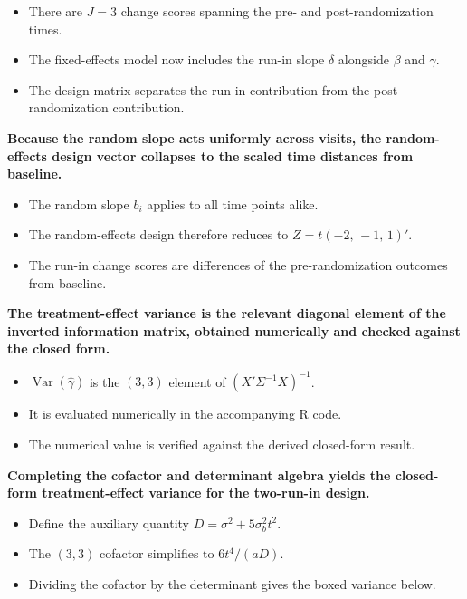 \documentclass[
  11pt,
]{article}
\begin{document}
\begin{itemize}\setlength{\itemsep}{2pt}\setlength{\parskip}{0pt}
\item There are $J = 3$ change scores spanning the pre- and post-randomization times.
\item The fixed-effects model now includes the run-in slope $\delta$ alongside $\beta$ and $\gamma$.
\item The design matrix separates the run-in contribution from the post-randomization contribution.
\end{itemize}

\textbf{Because the random slope acts uniformly across visits, the random-effects design vector collapses to the scaled time distances from baseline.}

\begin{itemize}\setlength{\itemsep}{2pt}\setlength{\parskip}{0pt}
\item The random slope $b_i$ applies to all time points alike.
\item The random-effects design therefore reduces to $Z = t(-2,\, -1,\, 1)'$.
\item The run-in change scores are differences of the pre-randomization outcomes from baseline.
\end{itemize}

\textbf{The treatment-effect variance is the relevant diagonal element of the inverted information matrix, obtained numerically and checked against the closed form.}

\begin{itemize}\setlength{\itemsep}{2pt}\setlength{\parskip}{0pt}
\item $\mathop{\mathrm{Var}}(\hat{\gamma})$ is the $(3,3)$ element of $(X'\Sigma^{-1}X)^{-1}$.
\item It is evaluated numerically in the accompanying R code.
\item The numerical value is verified against the derived closed-form result.
\end{itemize}

\textbf{Completing the cofactor and determinant algebra yields the closed-form treatment-effect variance for the two-run-in design.}

\begin{itemize}\setlength{\itemsep}{2pt}\setlength{\parskip}{0pt}
\item Define the auxiliary quantity $D = \sigma^2 + 5\sigma_b^2 t^2$.
\item The $(3,3)$ cofactor simplifies to $6t^4/(aD)$.
\item Dividing the cofactor by the determinant gives the boxed variance below.
\end{itemize}
\end{document}
